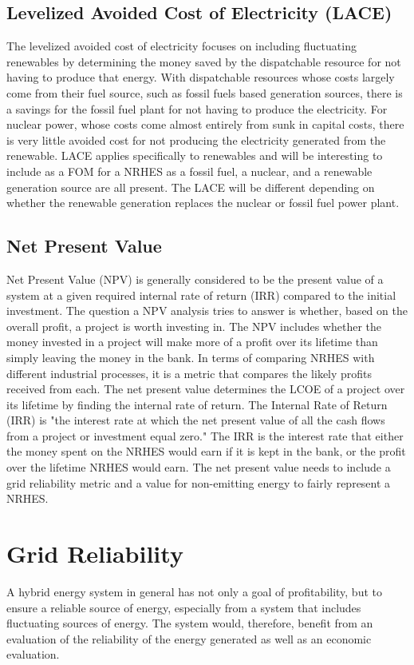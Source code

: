 \documentclass[12pt]{UIdahoMastersThesis}
\begin{document}
\subsection{Levelized Avoided Cost of Electricity (LACE)}
The levelized avoided cost of electricity focuses on including fluctuating renewables by determining the money saved by the dispatchable resource for not having to produce that energy. With dispatchable resources whose costs largely come from their fuel source, such as fossil fuels based generation sources, there is a savings for the fossil fuel plant for not having to produce the electricity.  For nuclear power, whose costs come almost entirely from sunk in capital costs, there is very little avoided cost for not producing the electricity generated from the renewable.  LACE applies specifically to renewables and will be interesting to include as a FOM for a NRHES as a fossil fuel, a nuclear, and a renewable generation source are all present. The LACE will be different depending on whether the renewable generation replaces the nuclear or fossil fuel power plant.
\subsection{Net Present Value}
Net Present Value (NPV) is generally considered to be the present value of a system at a given required internal rate of return (IRR) compared to the initial investment. The question a NPV analysis tries to answer is whether, based on the overall profit, a project is worth investing in.  The NPV includes whether the money invested in a project will make more of a profit over its lifetime than simply leaving the money in the bank.  In terms of comparing NRHES with different industrial processes, it is a metric that compares the likely profits received from each.  The net present value determines the LCOE of a project over its lifetime by finding the internal rate of return.  The Internal Rate of Return (IRR) is "the interest rate at which the net present value of all the cash flows from a project or investment equal zero."  The IRR is the interest rate that either the money spent on the NRHES would earn if it is kept in the bank, or the profit over the lifetime NRHES would earn.  The net present value needs to include a grid reliability metric and a value for non-emitting energy to fairly represent a NRHES.
\section{Grid Reliability}
A hybrid energy system in general has not only a goal of profitability, but to ensure a reliable source of energy, especially from a system that includes fluctuating sources of energy. The system would, therefore, benefit from an evaluation of the reliability of the energy generated as well as an economic evaluation.
\end{document}

